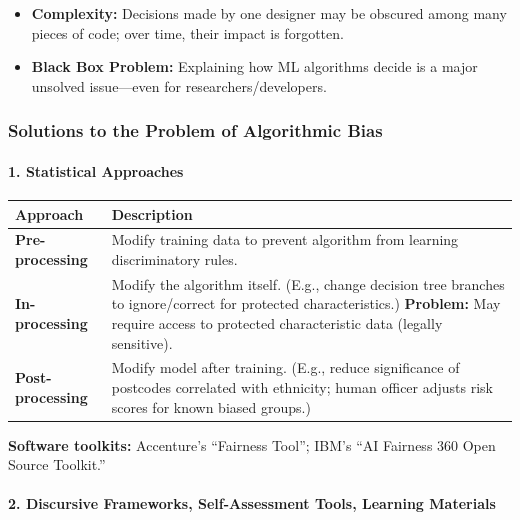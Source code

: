 \begin{itemize}
  \item \textbf{Complexity:} Decisions made by one designer may be obscured among many pieces of code; over time, their impact is forgotten.
  \item \textbf{Black Box Problem:} Explaining how ML algorithms decide is a major unsolved issue---even for researchers/developers.
\end{itemize}

\bigseparator

\subsubsection{Solutions to the Problem of Algorithmic Bias}

\paragraph*{1. Statistical Approaches}

\begin{center}
\renewcommand{\arraystretch}{1.3}
\begin{tabular}{@{} l p{9cm} @{}}
\toprule
\textbf{Approach} & \textbf{Description} \\
\midrule
\textbf{Pre-processing} & Modify training data to prevent algorithm from learning discriminatory rules. \\
\textbf{In-processing} & Modify the algorithm itself. (E.g., change decision tree branches to ignore/correct for protected characteristics.) \textbf{Problem:} May require access to protected characteristic data (legally sensitive). \\
\textbf{Post-processing} & Modify model after training. (E.g., reduce significance of postcodes correlated with ethnicity; human officer adjusts risk scores for known biased groups.) \\
\bottomrule
\end{tabular}
\end{center}

\textbf{Software toolkits:} Accenture's ``Fairness Tool''; IBM's ``AI Fairness 360 Open Source Toolkit.''

\separator

\paragraph*{2. Discursive Frameworks, Self-Assessment Tools, Learning Materials}


